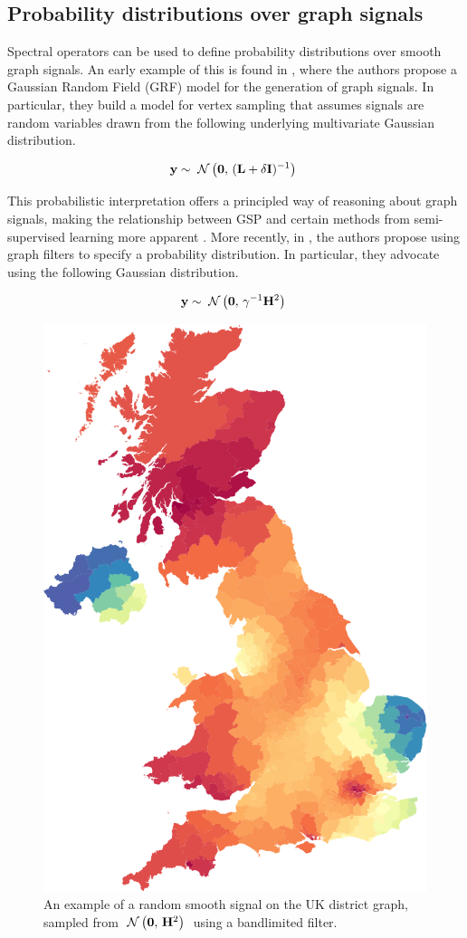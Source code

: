 \subsection{Probability distributions over graph signals}

Spectral operators can be used to define probability distributions over smooth graph signals. An early example of this is found in \cite{Gadde2015}, where the authors propose a Gaussian Random Field (GRF) model for the generation of graph signals. In particular, they build a model for vertex sampling that assumes signals are random variables drawn from the following underlying multivariate Gaussian distribution. 


\begin{equation}
    \mathbf{y} \sim \; \mathcal{N}\left(\mathbf{0}, \, (\mathbf{L} + \delta \mathbf{I})^{-1}\right) \;
\end{equation}


This probabilistic interpretation offers a principled way of reasoning about graph signals, making the relationship between GSP and certain methods from semi-supervised learning more apparent \citep{Zhu2003}. More recently, in \cite{Venkitaraman2020}, the authors propose using graph filters to specify a probability distribution. In particular, they advocate using the following Gaussian distribution. 

\begin{equation}
    \label{eq:gaussian_filter}
    \mathbf{y} \sim \; \mathcal{N}\left(\mathbf{0}, \, \gamma^{-1} \mathbf{H}^2\right) \;
\end{equation}

\begin{figure}
	\centering
		\includegraphics[width=0.7\linewidth]{Figures/uk_smooth.pdf}
	\caption[An example of a random smooth graph signal]{An example of a random smooth signal on the UK district graph, sampled from $\; \mathcal{N}\left(\mathbf{0}, \, \mathbf{H}^2\right) \;$ using a bandlimited filter. }
	\label{fig:random_smooth_uk}
\end{figure}


